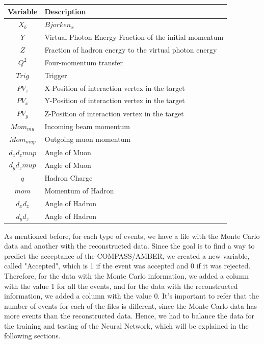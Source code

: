 \documentclass{article}
\begin{document}
\begin{table}[H]
    \centering
    \begin{tabular}{c|l}
    \textbf{Variable} & \textbf{Description} \\ \hline
    $X_b$ & $Bjorken_x$ \\
    $Y$ & Virtual Photon Energy Fraction of the initial momentum\\
    $Z$ & Fraction of hadron energy to the virtual photon energy \\
    $Q^2$ & Four-momentum transfer \\
    $Trig$ & Trigger \\
    $PV_z$ & X-Position of interaction vertex in the target\\
    $PV_x$ & Y-Position of interaction vertex in the target\\
    $PV_y$ & Z-Position of interaction vertex in the target\\
    $Mom_{mu}$ & Incoming beam momentum\\
    $Mom_{mup}$ & Outgoing muon momentum\\
    $d_xd_zmup$ & Angle of Muon \\
    $d_yd_zmup$ & Angle of Muon \\
    $q$ & Hadron Charge \\
    $mom$ & Momentum of Hadron \\
    $d_xd_z$ & Angle of Hadron \\
    $d_yd_z$ & Angle of Hadron \\
    \end{tabular}
\end{table}



As mentioned before, for each type of events, we have a file with the Monte Carlo data and another with the reconstructed data.
Since the goal is to find a way to predict the acceptance of the COMPASS/AMBER, we created a new variable, called "Accepted",
which is 1 if the event was accepted and 0 if it was rejected. Therefore, for the data with the Monte Carlo information, we added
a column with the value 1 for all the events, and for the data with the reconstructed information, we added a column with the value 0.
It's important to refer that the number of events for each of the files is different, since the Monte Carlo data has more events than the reconstructed data.
Hence, we had to balance the data for the training and testing of the Neural Network, which will be explained in the following sections.
\end{document}
